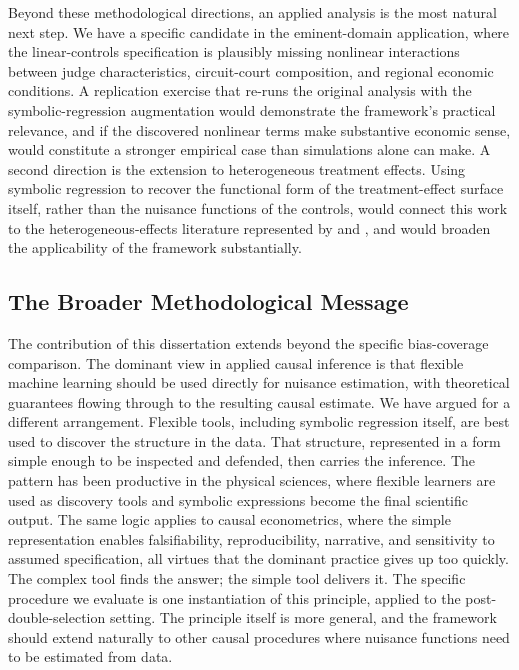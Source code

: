 \documentclass[11pt, a4paper]{article}
\theoremstyle{plain}
\theoremstyle{definition}
\theoremstyle{remark}
\begin{document}
Beyond these methodological
directions, an applied analysis is the most natural next step.
We have a specific candidate in the \citet{bch2014}
eminent-domain application, where the linear-controls
specification is plausibly missing nonlinear interactions
between judge characteristics, circuit-court composition, and
regional economic conditions. A replication exercise that
re-runs the original analysis with the symbolic-regression
augmentation would demonstrate the framework's practical
relevance, and if the discovered nonlinear terms make
substantive economic sense, would constitute a stronger
empirical case than simulations alone can make. A second
direction is the extension to heterogeneous treatment effects.
Using symbolic regression to recover the functional form of
the treatment-effect surface itself, rather than the nuisance
functions of the controls, would connect this work to the
heterogeneous-effects literature represented by
\citet{wager2018causal} and \citet{athey2016recursive}, and
would broaden the applicability of the framework substantially.

\subsection{The Broader Methodological Message}

The contribution of this dissertation extends beyond the
specific bias-coverage comparison. The dominant view in
applied causal inference is that flexible machine learning
should be used directly for nuisance estimation, with
theoretical guarantees flowing through to the resulting causal
estimate. We have argued for a different arrangement. Flexible
tools, including symbolic regression itself, are best used to
discover the structure in the data. That structure, represented
in a form simple enough to be inspected and defended, then
carries the inference. The pattern has been productive in the
physical sciences, where flexible learners are used as
discovery tools and symbolic expressions become the final
scientific output. The same logic applies to causal
econometrics, where the simple representation enables
falsifiability, reproducibility, narrative, and sensitivity to
assumed specification, all virtues that the dominant practice
gives up too quickly. The complex tool finds the answer; the
simple tool delivers it. The specific procedure we evaluate is
one instantiation of this principle, applied to the
post-double-selection setting. The principle itself is more
general, and the framework should extend naturally to other
causal procedures where nuisance functions need to be estimated
from data.

\newpage

\end{document}
